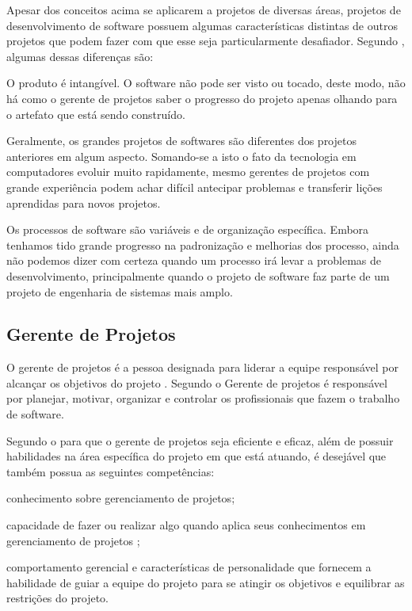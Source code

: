 \documentclass[
    12pt,               %
    openright,          %
    twoside,            %
    a4paper,            %
    chapter=TITLE,     %
    english,            %
    spanish,            %
    portuguese              %
    ]{abntex2}
\begin{document}
Apesar dos conceitos acima se aplicarem a projetos de diversas áreas, projetos de desenvolvimento de software possuem algumas características distintas de outros projetos que podem fazer com que esse seja particularmente desafiador. Segundo , algumas dessas diferenças são:

\begin{alineas}
	\item O produto é intangível. O software não pode ser visto ou tocado, deste modo, não há como o gerente de projetos saber o progresso do projeto apenas olhando para o artefato que está sendo construído.
	\item Geralmente, os grandes projetos de softwares são diferentes dos projetos anteriores em algum aspecto. Somando-se a isto o fato da tecnologia em computadores evoluir muito rapidamente, mesmo gerentes de projetos com grande experiência podem achar difícil antecipar problemas e transferir lições aprendidas para novos projetos.
	\item Os processos de software são variáveis e de organização específica. Embora tenhamos tido grande progresso na padronização e melhorias dos processo, ainda não podemos dizer com certeza quando um processo irá levar a problemas de desenvolvimento, principalmente quando o projeto de software faz parte de um projeto de engenharia de sistemas mais amplo.
\end{alineas}


\subsection{Gerente de Projetos}
O gerente de projetos é a pessoa designada para liderar a equipe responsável por alcançar os objetivos do projeto \cite[p.~16]{pmi2013}. Segundo  o Gerente de projetos é responsável por planejar, motivar, organizar e controlar os profissionais que fazem o trabalho de software.

Segundo o  para que o gerente de projetos seja eficiente e eficaz, além de possuir habilidades na área específica do projeto em que está atuando, é desejável que também possua as seguintes competências:

\begin{alineas}
	\item conhecimento sobre gerenciamento de projetos;
	\item capacidade de fazer ou realizar algo quando aplica seus conhecimentos em gerenciamento de projetos ;
	\item comportamento gerencial e características de personalidade que fornecem a habilidade de guiar a equipe do projeto para se atingir os objetivos e equilibrar as restrições do projeto.
\end{alineas}
\end{document}
